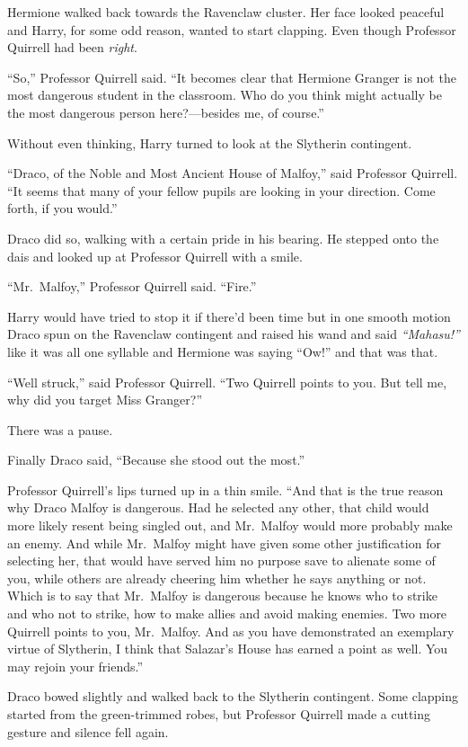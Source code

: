 Hermione walked back towards the Ravenclaw cluster. Her face looked
peaceful and Harry, for some odd reason, wanted to start clapping. Even
though Professor Quirrell had been \emph{right}.

``So,'' Professor Quirrell said. ``It becomes clear that Hermione
Granger is not the most dangerous student in the classroom. Who do you
think might actually be the most dangerous person here?---besides me, of
course.''

Without even thinking, Harry turned to look at the Slytherin contingent.

``Draco, of the Noble and Most Ancient House of Malfoy,'' said Professor
Quirrell. ``It seems that many of your fellow pupils are looking in your
direction. Come forth, if you would.''

Draco did so, walking with a certain pride in his bearing. He stepped
onto the dais and looked up at Professor Quirrell with a smile.

``Mr.~Malfoy,'' Professor Quirrell said. ``Fire.''

Harry would have tried to stop it if there'd been time but in one smooth
motion Draco spun on the Ravenclaw contingent and raised his wand and
said \emph{``Mahasu!''} like it was all one syllable and Hermione was
saying ``Ow!'' and that was that.

``Well struck,'' said Professor Quirrell. ``Two Quirrell points to you.
But tell me, why did you target Miss Granger?''

There was a pause.

Finally Draco said, ``Because she stood out the most.''

Professor Quirrell's lips turned up in a thin smile. ``And that is the
true reason why Draco Malfoy is dangerous. Had he selected any other,
that child would more likely resent being singled out, and Mr.~Malfoy
would more probably make an enemy. And while Mr.~Malfoy might have given
some other justification for selecting her, that would have served him
no purpose save to alienate some of you, while others are already
cheering him whether he says anything or not. Which is to say that
Mr.~Malfoy is dangerous because he knows who to strike and who not to
strike, how to make allies and avoid making enemies. Two more Quirrell
points to you, Mr.~Malfoy. And as you have demonstrated an exemplary
virtue of Slytherin, I think that Salazar's House has earned a point as
well. You may rejoin your friends.''

Draco bowed slightly and walked back to the Slytherin contingent. Some
clapping started from the green-trimmed robes, but Professor Quirrell
made a cutting gesture and silence fell again.

